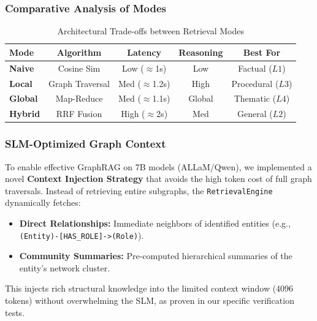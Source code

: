 \documentclass[11pt, onecolumn]{article}
\begin{document}
\subsubsection{Comparative Analysis of Modes}
\begin{table}[H]
    \centering
    \begin{tabular}{lcccc}
        \toprule
        \textbf{Mode} & \textbf{Algorithm} & \textbf{Latency} & \textbf{Reasoning} & \textbf{Best For} \\
        \midrule
        \textbf{Naive} & Cosine Sim & Low ($\approx$1s) & Low & Factual ($L1$) \\
        \textbf{Local} & Graph Traversal & Med ($\approx$1.2s) & High & Procedural ($L3$) \\
        \textbf{Global} & Map-Reduce & Med ($\approx$1.1s) & Global & Thematic ($L4$) \\
        \textbf{Hybrid} & RRF Fusion & High ($\approx$2s) & Med & General ($L2$) \\
        \bottomrule
    \end{tabular}
    \caption{Architectural Trade-offs between Retrieval Modes}
\end{table}

\subsubsection{SLM-Optimized Graph Context}
To enable effective GraphRAG on 7B models (ALLaM/Qwen), we implemented a novel \textbf{Context Injection Strategy} that avoids the high token cost of full graph traversals. Instead of retrieving entire subgraphs, the \texttt{RetrievalEngine} dynamically fetches:
\begin{itemize}
    \item \textbf{Direct Relationships:} Immediate neighbors of identified entities (e.g., \texttt{(Entity)-[HAS\_ROLE]->(Role)}).
    \item \textbf{Community Summaries:} Pre-computed hierarchical summaries of the entity's network cluster.
\end{itemize}
This injects rich structural knowledge into the limited context window (4096 tokens) without overwhelming the SLM, as proven in our specific verification tests.
\end{document}
